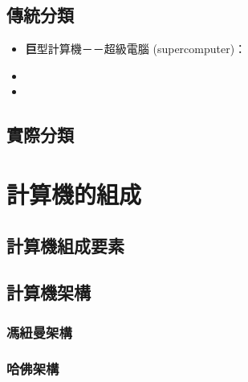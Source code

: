 \documentclass[12pt,a4paper,oneside]{book}
\begin{document}
\begin{CJK}{UTF8}{bkai}
\subsection{傳統分類}
\begin{itemize}
\item \textbf{巨}型計算機－－超級電腦 (supercomputer)：
\item
\item
\end{itemize}

\subsection{實際分類}

\section{計算機的組成}

\subsection{計算機組成要素}

\subsection{計算機架構}

\subsubsection{馮紐曼架構}

\subsubsection{哈佛架構}

\clearpage
\end{CJK}
\end{document}
